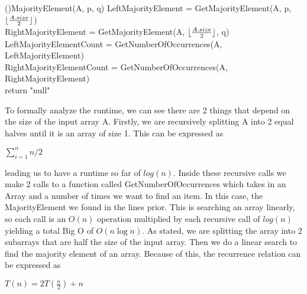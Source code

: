 \documentclass[11pt]{amsart}
\DeclarePairedDelimiter\floor{\lfloor}{\rfloor}
\begin{document}
\begin{enumerate}
\begin{algorithm}[H]
	\Fn(){MajorityElement(A, p, q)}{
	\SetAlgoLined
	\SetNoFillComment
	\DontPrintSemicolon
		LeftMajorityElement = GetMajorityElement(A, p, $\floor{\frac{A.size}{2}}$)\\
		RightMajorityElement = GetMajorityElement(A, $\floor{\frac{A.size}{2}}$, q)\\
		LeftMajorityElementCount = GetNumberOfOccurrences(A, LeftMajorityElement)\\
		RightMajorityElementCount = GetNumberOfOccurrences(A, RightMajorityElement)\\
		return "null"
	}
\end{algorithm}
\bigskip
To formally analyze the runtime, we can see there are 2 things that depend on the size of the input array A. Firstly, we are recursively splitting A into 2 equal halves until it is an array of size 1. This can be expressed as\\
\begin{center}
	$\sum_{i=1}^{n} n / 2$
\end{center}
\bigskip
leading us to have a runtime so far of $log(n)$. Inside these recursive calls we make 2 calls to a function called GetNumberOfOccurrences which takes in an Array and a number of times we want to find an item. In this case, the MajorityElement we found in the lines prior. This is searching an array linearly, so each call is an $O(n)$ operation multiplied by each recursive call of $log(n)$ yielding a total Big O of $O(n\log n)$. As stated, we are splitting the array into 2 subarrays that are half the size of the input array. Then we do a linear search to find the majority element of an array. Because of this, the recurrence relation can be expressed as
\bigskip
\begin{center}
	$T(n) = 2T(\frac{n}{2}) + n$
\end{center}
\newpage


\end{enumerate}
\end{document}
